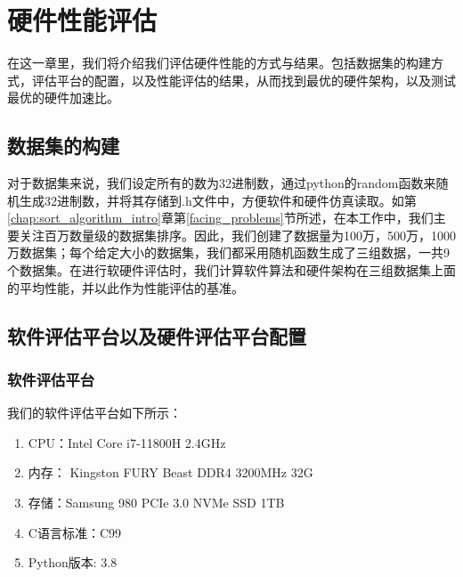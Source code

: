 
\chapter{硬件性能评估}
\label{chap:hardware_evaluation}
在这一章里，我们将介绍我们评估硬件性能的方式与结果。包括数据集的构建方式，评估平台的配置，以及性能评估的结果，从而找到最优的硬件架构，以及测试最优的硬件加速比。

\section{数据集的构建}

对于数据集来说，我们设定所有的数为32进制数，通过python的random函数来随机生成32进制数，并将其存储到.h文件中，方便软件和硬件仿真读取。如第\ref{chap:sort_algorithm_intro}章第\ref{facing_problems}节所述，在本工作中，我们主要关注百万数量级的数据集排序。因此，我们创建了数据量为100万，500万，1000万数据集；每个给定大小的数据集，我们都采用随机函数生成了三组数据，一共9个数据集。在进行软硬件评估时，我们计算软件算法和硬件架构在三组数据集上面的平均性能，并以此作为性能评估的基准。

\section{软件评估平台以及硬件评估平台配置}

\subsection{软件评估平台}
我们的软件评估平台如下所示：
\begin{enumerate}
    \item CPU：Intel Core i7-11800H 2.4GHz
    \item 内存： Kingston FURY Beast DDR4 3200MHz 32G
    \item 存储：Samsung 980 PCIe 3.0 NVMe SSD 1TB
    \item C语言标准：C99
    \item Python版本: 3.8
\end{enumerate}

